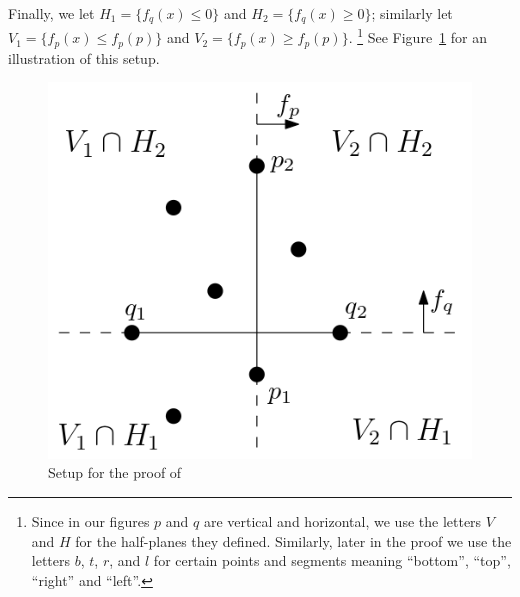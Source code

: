 \documentclass[12pt]{article}
\newcommand{\conv}{\ensuremath{\mathrm{conv}}\hspace{1pt}}
\begin{document}
Finally, we let $H_1=\{f_q(x) \leq 0\}$ and $H_2=\{f_q(x) \geq 0\}$; similarly let $V_1=\{f_p(x) \leq f_p(p)\}$ and $V_2=\{f_p(x) \geq f_p(p)\}$.%
\footnote{Since in our figures $p$ and $q$ are vertical and horizontal, we use the letters $V$ and $H$ for the half-planes they defined. Similarly, later in the proof we use the letters $b$, $t$, $r$, and $l$ for certain  points and segments meaning ``bottom'', ``top'', ``right'' and ``left''.}
See Figure~\ref{fig:setup} for an illustration of this setup.
%
\begin{figure}[htb]
\includegraphics[scale=.3]{setup.png}
\caption{Setup for the proof of }
\label{fig:setup}
\end{figure}

%
\end{document}
